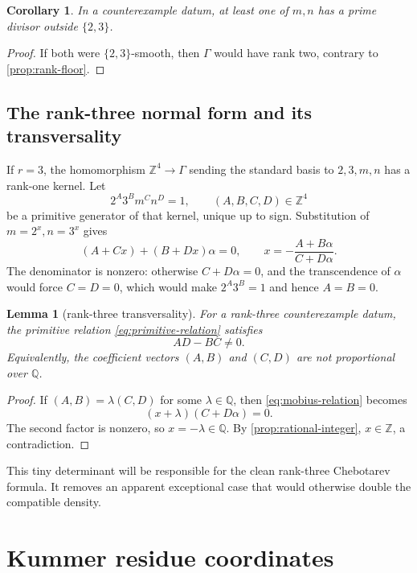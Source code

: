 \documentclass[11pt,oneside]{article}
\newtheorem{lemma}[theorem]{Lemma}
\newtheorem{corollary}[theorem]{Corollary}
\theoremstyle{definition}
\theoremstyle{remark}
\newcommand{\Q}{\mathbb{Q}}
\newcommand{\Z}{\mathbb{Z}}
\begin{document}
\begin{corollary}\label{cor:outside-prime}
In a counterexample datum, at least one of $m,n$ has a prime divisor outside
$\{2,3\}$.
\end{corollary}

\begin{proof}
If both were $\{2,3\}$-smooth, then $\Gamma$ would have rank two, contrary to
\cref{prop:rank-floor}.
\end{proof}

\subsection{The rank-three normal form and its transversality}

If $r=3$, the homomorphism $\Z^4\to\Gamma$ sending the standard basis to
$2,3,m,n$ has a rank-one kernel.  Let
\begin{equation}\label{eq:primitive-relation}
 2^A3^B m^C n^D=1,
 \qquad (A,B,C,D)\in\Z^4
\end{equation}
be a primitive generator of that kernel, unique up to sign.
Substitution of $m=2^x,n=3^x$ gives
\begin{equation}\label{eq:mobius-relation}
 (A+Cx)+(B+Dx)\alpha=0,
 \qquad
 x=-\frac{A+B\alpha}{C+D\alpha}.
\end{equation}
The denominator is nonzero: otherwise $C+D\alpha=0$, and the transcendence
of $\alpha$ would force $C=D=0$, which would make
$2^A3^B=1$ and hence $A=B=0$.

\begin{lemma}[rank-three transversality]\label{lem:rank3-transverse}
For a rank-three counterexample datum, the primitive relation
\eqref{eq:primitive-relation} satisfies
\[
 AD-BC\ne0.
\]
Equivalently, the coefficient vectors $(A,B)$ and $(C,D)$ are not
proportional over $\Q$.
\end{lemma}

\begin{proof}
If $(A,B)=\lambda(C,D)$ for some $\lambda\in\Q$, then
\eqref{eq:mobius-relation} becomes
\[
 (x+\lambda)(C+D\alpha)=0.
\]
The second factor is nonzero, so $x=-\lambda\in\Q$.  By
\cref{prop:rational-integer}, $x\in\Z$, a contradiction.
\end{proof}

This tiny determinant will be responsible for the clean rank-three
Chebotarev formula.  It removes an apparent exceptional case that would
otherwise double the compatible density.

\section{Kummer residue coordinates}\label{sec:kummer-setup}
\end{document}
